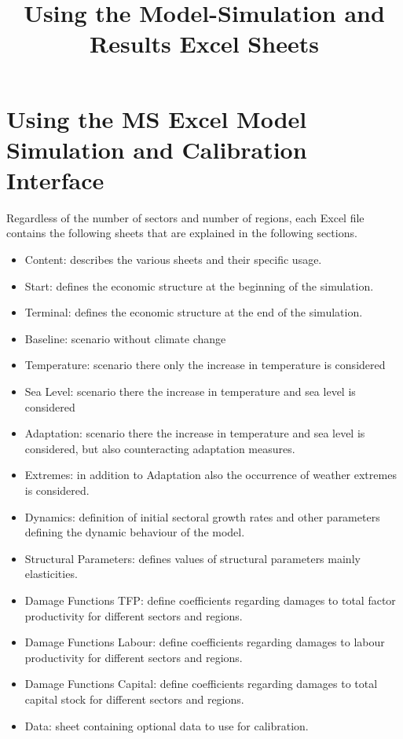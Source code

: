 \documentclass[10pt,a4paper]{article}
\begin{document}
\title{Using the Model-Simulation and Results Excel Sheets}
\maketitle
\section{Using the MS Excel Model Simulation and Calibration Interface}

Regardless of the number of sectors and number of regions, each Excel file contains the following sheets that are explained in the following sections.

\begin{itemize}\setlength{\itemsep}{0pt}
\item Content: describes the various sheets and their specific usage.
\item Start: defines the economic structure at the beginning of the simulation.
\item Terminal: defines the economic structure at the end of the simulation.
\item Baseline: scenario without climate change
\item Temperature: scenario there only the increase in temperature is considered
\item Sea Level: scenario there the increase in temperature and sea level is considered 
\item Adaptation: scenario there the increase in temperature and sea level is considered, but also counteracting adaptation measures.
\item Extremes: in addition to Adaptation also the occurrence of weather extremes is considered.
\item Dynamics: definition of initial sectoral growth rates and other parameters defining the dynamic behaviour of the model.
\item Structural Parameters: defines values of structural parameters mainly elasticities.
\item Damage Functions TFP: define coefficients regarding damages to total factor productivity for different sectors and regions.
\item Damage Functions Labour: define coefficients regarding damages to labour productivity for different sectors and regions.
\item Damage Functions Capital: define coefficients regarding damages to total capital stock for different sectors and regions.
\item Data: sheet containing optional data to use for calibration.


\end{itemize}
\end{document}
